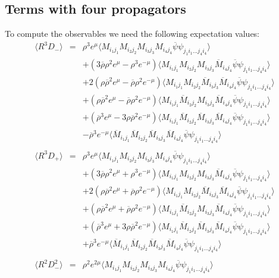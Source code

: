 \documentclass[a4paper,10pt]{report}
\newcommand{\ol}[1]{\overline{#1}}
\newcommand{\rrb}{\overline{\rho}}
\newcommand{\rr}{\rho}
\newcommand{\emu}{e^{\mu}}
\newcommand{\emmu}{e^{-\mu}}
\newcommand{\Mb}{\ol{M}}
\newcommand{\mv}[1]{\langle #1 \rangle}
\newcommand{\ppb}{\ol{\psi}\psi}
\begin{document}
\newpage
\subsection*{Terms with four propagators}

To compute the observables we need the following expectation values:
\begin{eqnarray}
\mv{R^3D_-} &=& \rr^3\emu  \mv{M_{i_1j_1}M_{i_2j_2}M_{i_3j_3}M_{i_4j_4} \ppb_{j_1i_1...j_4i_4}}\nonumber\\
          && + (3\rrb\rr^2\emu - \rr^3\emmu) \mv{M_{i_1j_1}M_{i_2j_2}M_{i_3j_3}\Mb_{i_4j_4} \ppb_{j_1i_1...j_4i_4}} \nonumber\\
          && + 2(\rr\rrb^2\emu - \rrb\rr^2\emmu) \mv{M_{i_1j_1}M_{i_2j_2}\Mb_{i_3j_3}\Mb_{i_4j_4} \ppb_{j_1i_1...j_4i_4}} \nonumber\\
          && + (\rr\rrb^2\emu - \rrb\rr^2\emmu) \mv{M_{i_1j_1}\Mb_{i_2j_2}M_{i_3j_3}\Mb_{i_4j_4} \ppb_{j_1i_1...j_4i_4}} \nonumber\\
          && + (\rrb^3\emu - 3\rr\rrb^2\emmu) \mv{M_{i_1j_1}\Mb_{i_2j_2}\Mb_{i_3j_3}\Mb_{i_4j_4} \ppb_{j_1i_1...j_4i_4}} \nonumber\\
          && - \rrb^3\emmu \mv{\Mb_{i_1j_1}\Mb_{i_2j_2}\Mb_{i_3j_3}\Mb_{i_4j_4} \ppb_{j_1i_1...j_4i_4}}    \\
\nonumber\\
\mv{R^3D_+} &=& \rr^3\emu  \mv{M_{i_1j_1}M_{i_2j_2}M_{i_3j_3}M_{i_4j_4} \ppb_{j_1i_1...j_4i_4}}\nonumber\\
          && + (3\rrb\rr^2\emu + \rr^3\emmu) \mv{M_{i_1j_1}M_{i_2j_2}M_{i_3j_3}\Mb_{i_4j_4} \ppb_{j_1i_1...j_4i_4}} \nonumber\\
          && + 2(\rr\rrb^2\emu + \rrb\rr^2\emmu) \mv{M_{i_1j_1}M_{i_2j_2}\Mb_{i_3j_3}\Mb_{i_4j_4} \ppb_{j_1i_1...j_4i_4}} \nonumber\\
          && + (\rr\rrb^2\emu + \rrb\rr^2\emmu) \mv{M_{i_1j_1}\Mb_{i_2j_2}M_{i_3j_3}\Mb_{i_4j_4} \ppb_{j_1i_1...j_4i_4}} \nonumber\\
          && + (\rrb^3\emu + 3\rr\rrb^2\emmu) \mv{M_{i_1j_1}\Mb_{i_2j_2}\Mb_{i_3j_3}\Mb_{i_4j_4} \ppb_{j_1i_1...j_4i_4}} \nonumber\\
          && + \rrb^3\emmu \mv{\Mb_{i_1j_1}\Mb_{i_2j_2}\Mb_{i_3j_3}\Mb_{i_4j_4} \ppb_{j_1i_1...j_4i_4}}    \\
\nonumber\\
\mv{R^2D^2_-} &=& \rr^2e^{2\mu}  \mv{M_{i_1j_1}M_{i_2j_2}M_{i_3j_3}M_{i_4j_4} \ppb_{j_1i_1...j_4i_4}}\nonumber\\

\end{eqnarray}
\end{document}
